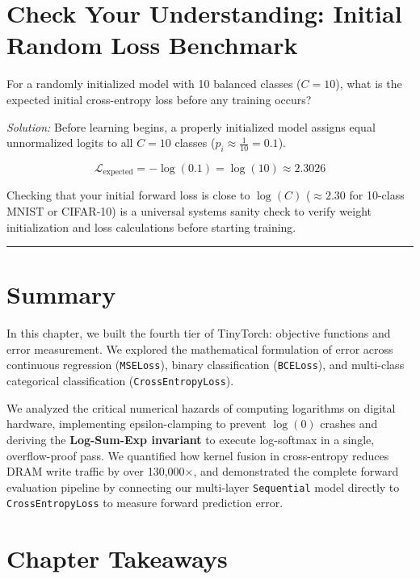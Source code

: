 \documentclass[
  letterpaper,
]{scrbook}
\begin{document}
\section{Check Your Understanding: Initial Random Loss
Benchmark}\label{check-your-understanding-initial-random-loss-benchmark}

For a randomly initialized model with 10 balanced classes (\(C = 10\)),
what is the expected initial cross-entropy loss before any training
occurs?

\emph{Solution:} Before learning begins, a properly initialized model
assigns equal unnormalized logits to all \(C = 10\) classes
(\(p_i \approx \frac{1}{10} = 0.1\)).

\[\mathcal{L}_{\text{expected}} = -\log(0.1) = \log(10) \approx 2.3026\]

Checking that your initial forward loss is close to \(\log(C)\)
(\(\approx 2.30\) for 10-class MNIST or CIFAR-10) is a universal systems
sanity check to verify weight initialization and loss calculations
before starting training.

\begin{center}\rule{0.5\linewidth}{0.5pt}\end{center}

\section{Summary}\label{summary-4}

In this chapter, we built the fourth tier of TinyTorch: objective
functions and error measurement. We explored the mathematical
formulation of error across continuous regression (\texttt{MSELoss}),
binary classification (\texttt{BCELoss}), and multi-class categorical
classification (\texttt{CrossEntropyLoss}).

We analyzed the critical numerical hazards of computing logarithms on
digital hardware, implementing epsilon-clamping to prevent \(\log(0)\)
crashes and deriving the \textbf{Log-Sum-Exp invariant} to execute
log-softmax in a single, overflow-proof pass. We quantified how kernel
fusion in cross-entropy reduces DRAM write traffic by over 130,000×, and
demonstrated the complete forward evaluation pipeline by connecting our
multi-layer \texttt{Sequential} model directly to
\texttt{CrossEntropyLoss} to measure forward prediction error.

\section{Chapter Takeaways}\label{chapter-takeaways-4}
\end{document}
